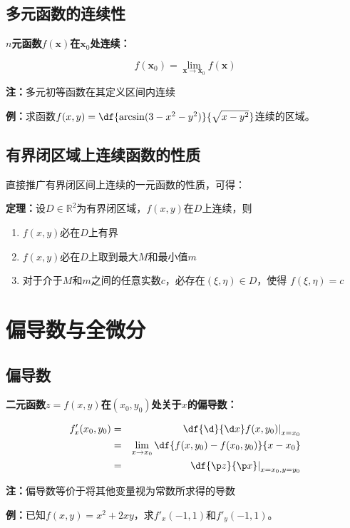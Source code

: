 \subsection{多元函数的连续性}

{\bf $n$元函数$f(\bm{x})$在$\bm{x}_0$处连续：}

$$f(\bm{x}_0)=\lim\limits_{\bm{x}\to\bm{x}_0}f(\bm{x})$$

{\bf 注：}多元初等函数在其定义区间内连续

{\bf 例：}求函数$f(x,y)=\df{\arcsin(3-x^2-y^2)}{\sqrt{x-y^2}}$连续的区域。

\subsection{有界闭区域上连续函数的性质}

直接推广有界闭区间上连续的一元函数的性质，可得：

{\bf 定理：}设$D\in\mathbb{R}^2$为有界闭区域，$f(x,y)$在$D$上连续，则
\begin{enumerate}[(1)]
  \setlength{\itemindent}{1cm}
  \item $f(x,y)$必在$D$上有界
  \item $f(x,y)$必在$D$上取到最大$M$和最小值$m$
  \item 对于介于$M$和$m$之间的任意实数$c$，必存在$(\xi,\eta)\in{D}$，使得
  $f(\xi,\eta)=c$
\end{enumerate}

\section{偏导数与全微分}

\subsection{偏导数}

{\bf 二元函数$z=f(x,y)$在$(x_0,y_0)$处关于$x$的偏导数：}

\begin{eqnarray*}
	{f'_x(x_0,y_0)}  & = &
	\left.\df{\d}{\d x}f(x,y_0)\right|_{x=x_0} \\ 
	& = & \lim\limits_{x\to x_0}\df{f(x,y_0)-f(x_0,y_0)}{x-x_0} \\
	& = & {\left.\df{\p z}{\p x}\right|_{x=x_0,y=y_0}}
\end{eqnarray*}

{\bf 注：}偏导数等价于将其他变量视为常数所求得的导数

{\bf 例：}已知$f(x,y)=x^2+2xy$，求$f'_x(-1,1)$和$f'_y(-1,1)$。

